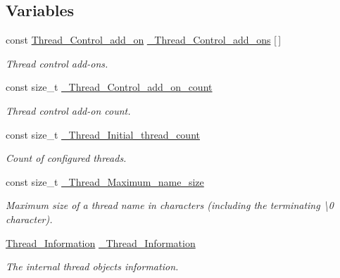 \subsection*{Variables}
\begin{DoxyCompactItemize}
\item 
const \mbox{\hyperlink{structThread__Control__add__on}{Thread\+\_\+\+Control\+\_\+add\+\_\+on}} \mbox{\hyperlink{group__RTEMSScoreThread_ga60a80015d5ec442d6e0f42c1c7969d0a}{\+\_\+\+Thread\+\_\+\+Control\+\_\+add\+\_\+ons}} \mbox{[}$\,$\mbox{]}
\begin{DoxyCompactList}\small\item\em Thread control add-\/ons. \end{DoxyCompactList}\item 
const size\+\_\+t \mbox{\hyperlink{group__RTEMSScoreThread_ga93f9a4600ed05daba5da3a8111393fbb}{\+\_\+\+Thread\+\_\+\+Control\+\_\+add\+\_\+on\+\_\+count}}
\begin{DoxyCompactList}\small\item\em Thread control add-\/on count. \end{DoxyCompactList}\item 
const size\+\_\+t \mbox{\hyperlink{group__RTEMSScoreThread_ga1626b8af19f26d5f6874121bb3c1cc05}{\+\_\+\+Thread\+\_\+\+Initial\+\_\+thread\+\_\+count}}
\begin{DoxyCompactList}\small\item\em Count of configured threads. \end{DoxyCompactList}\item 
const size\+\_\+t \mbox{\hyperlink{group__RTEMSScoreThread_gae17e2d6bbad850c7adffc4515ac56087}{\+\_\+\+Thread\+\_\+\+Maximum\+\_\+name\+\_\+size}}
\begin{DoxyCompactList}\small\item\em Maximum size of a thread name in characters (including the terminating \textquotesingle{}\textbackslash{}0\textquotesingle{} character). \end{DoxyCompactList}\item 
\mbox{\label{group__RTEMSScoreThread_ga165e573eece55768db9b693018222bc3}} 
\mbox{\hyperlink{structThread__Information}{Thread\+\_\+\+Information}} \mbox{\hyperlink{group__RTEMSScoreThread_ga165e573eece55768db9b693018222bc3}{\+\_\+\+Thread\+\_\+\+Information}}
\begin{DoxyCompactList}\small\item\em The internal thread objects information. \end{DoxyCompactList}\item 

\end{DoxyCompactItemize}

